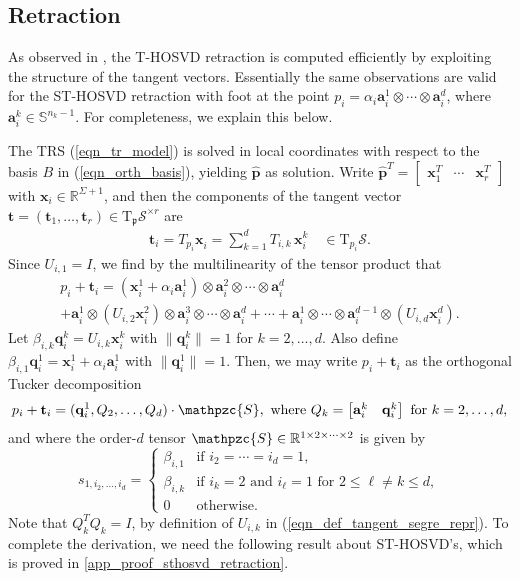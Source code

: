 \documentclass[a4paper,10pt,final]{siamart1116}
\newcommand{\tuple}[1]{\mathfrak{#1}}
\newcommand{\Var}[1]{\mathcal{#1}}
\newcommand{\tensor}[1]{\mathpzc{#1}}
\newcommand{\vect}[1]{\mathbf{#1}}
\newcommand{\sten}[3]{\vect{#1}_{#2}^{#3}}
\newcommand{\Tang}[2]{\mathrm{T}_{#1} {#2}}
\newcommand{\R}{\mathbb{R}}
\newcommand{\refeqn}[1]{{(\ref{#1})}}
\newcommand{\refapp}[1]{{\cref{#1}}}
\numberwithin{equation}{section}
\numberwithin{figure}{section}
\numberwithin{table}{section}
\numberwithin{theorem}{section}
\begin{document}
\subsection{Retraction} \label{sec_fast_retraction}
As observed in \cite[section 3.3]{KSV2014}, the T-HOSVD retraction is computed efficiently by exploiting the structure of the tangent vectors. Essentially the same observations are valid for the ST-HOSVD retraction with foot at the point $p_i = \alpha_i \sten{a}{i}{1} \otimes \cdots \otimes \sten{a}{i}{d}$, where $\sten{a}{i}{k} \in \mathbb{S}^{n_k-1}$. For completeness, we explain this below.

The TRS \refeqn{eqn_tr_model} is solved in local coordinates with respect to the basis $B$ in \refeqn{eqn_orth_basis}, yielding $\widehat{\vect{p}}$ as solution. Write
\(
\widehat{\vect{p}}^T =
\begin{bmatrix}
\sten{x}{1}{T} &
\cdots &
\sten{x}{r}{T}
\end{bmatrix}
\)
with $\vect{x}_i \in \R^{\Sigma+1}$, and then the components of the tangent vector $\vect{t} = (\vect{t}_1, \ldots, \vect{t}_r) \in \Tang{\tuple{p}}{\Var{S}^{\times r}}$ are
\begin{align*}
\vect{t}_i
= T_{p_i} \sten{x}{i}{}
= \sum_{k=1}^d T_{i,k} \, \sten{x}{i}{k} \quad\in\Tang{p_i}{\Var{S}}.
\end{align*}
Since $U_{i,1} = I$, we find by the multilinearity of the tensor product that
\begin{multline*}
p_i + \vect{t}_i = (\sten{x}{i}{1} +  \alpha_i \sten{a}{i}{1}) \otimes \sten{a}{i}{2}\otimes\cdots\otimes\sten{a}{i}{d} \\
+\sten{a}{i}{1}\otimes (U_{i,2} \sten{x}{i}{2})\otimes \sten{a}{i}{3} \otimes \cdots\otimes \sten{a}{i}{d} +
 \cdots + \sten{a}{i}{1}\otimes\cdots\otimes\sten{a}{i}{d-1}\otimes (U_{i,d}\sten{x}{i}{d}).
\end{multline*}
Let $\beta_{i,k} \sten{q}{i}{k} = U_{i,k}\sten{x}{i}{k}$ with $\|\sten{q}{i}{k}\|=1$ for $k=2,\ldots,d$. Also define $\beta_{i,1} \sten{q}{i}{1} = \sten{x}{i}{1} + \alpha_i \sten{a}{i}{1}$ with $\|\sten{q}{i}{1}\|=1$.
Then, we may write $p_i + \vect{t}_i$ as {the orthogonal Tucker decomposition}
\begin{align}\label{eqn_rank_one_plus_tg}
 p_i + \vect{t}_i = ( \sten{q}{i}{1}, Q_2, \ldots, Q_d ) \cdot \tensor{S}, \text{ where } Q_k = \begin{bmatrix} \sten{a}{i}{k} & \sten{q}{i}{k} \end{bmatrix} \text{ for }  k = 2,\ldots,d,
\end{align}
and where the order-$d$ tensor $\tensor{S} \in \R^{1 \times 2 \times \cdots \times 2}$ is given by
\[
 s_{1,i_2,\ldots,i_d} =
 \begin{cases}
 \beta_{i,1} & \text{if } i_2 = \cdots = i_d = 1, \\
 \beta_{i,k} & \text{if } i_k=2 \text{ and } i_\ell = 1 \text{ for } 2 \le \ell \ne k \le d,\\
  0 & \text{otherwise}.
 \end{cases}
\]
Note that $Q_k^T Q_k = I$, by definition of $U_{i,k}$ in \refeqn{eqn_def_tangent_segre_repr}. To complete the derivation, we need the following result about ST-HOSVD's, which is proved in \refapp{app_proof_sthosvd_retraction}.
\end{document}
